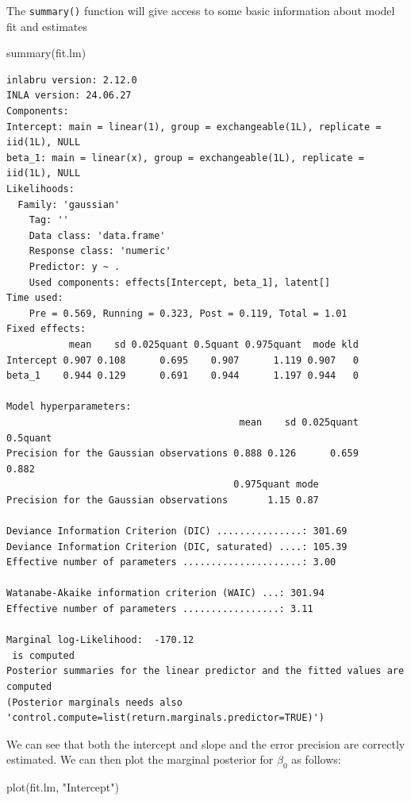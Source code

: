 \documentclass[
  letterpaper,
  DIV=11,
  numbers=noendperiod]{scrartcl}
\newenvironment{Shaded}{\begin{snugshade}}{\end{snugshade}}
\newcommand{\FunctionTok}[1]{\textcolor[rgb]{0.28,0.35,0.67}{#1}}
\newcommand{\NormalTok}[1]{\textcolor[rgb]{0.00,0.23,0.31}{#1}}
\newcommand{\StringTok}[1]{\textcolor[rgb]{0.13,0.47,0.30}{#1}}
\begin{document}
The \texttt{summary()} function will give access to some basic
information about model fit and estimates

\begin{Shaded}
\begin{Highlighting}[]
\FunctionTok{summary}\NormalTok{(fit.lm)}
\end{Highlighting}
\end{Shaded}

\begin{verbatim}
inlabru version: 2.12.0
INLA version: 24.06.27
Components:
Intercept: main = linear(1), group = exchangeable(1L), replicate = iid(1L), NULL
beta_1: main = linear(x), group = exchangeable(1L), replicate = iid(1L), NULL
Likelihoods:
  Family: 'gaussian'
    Tag: ''
    Data class: 'data.frame'
    Response class: 'numeric'
    Predictor: y ~ .
    Used components: effects[Intercept, beta_1], latent[]
Time used:
    Pre = 0.569, Running = 0.323, Post = 0.119, Total = 1.01 
Fixed effects:
           mean    sd 0.025quant 0.5quant 0.975quant  mode kld
Intercept 0.907 0.108      0.695    0.907      1.119 0.907   0
beta_1    0.944 0.129      0.691    0.944      1.197 0.944   0

Model hyperparameters:
                                         mean    sd 0.025quant 0.5quant
Precision for the Gaussian observations 0.888 0.126      0.659    0.882
                                        0.975quant mode
Precision for the Gaussian observations       1.15 0.87

Deviance Information Criterion (DIC) ...............: 301.69
Deviance Information Criterion (DIC, saturated) ....: 105.39
Effective number of parameters .....................: 3.00

Watanabe-Akaike information criterion (WAIC) ...: 301.94
Effective number of parameters .................: 3.11

Marginal log-Likelihood:  -170.12 
 is computed 
Posterior summaries for the linear predictor and the fitted values are computed
(Posterior marginals needs also 'control.compute=list(return.marginals.predictor=TRUE)')
\end{verbatim}

We can see that both the intercept and slope and the error precision are
correctly estimated. We can then plot the marginal posterior for
\(\beta_0\) as follows:

\begin{Shaded}
\begin{Highlighting}[]
\FunctionTok{plot}\NormalTok{(fit.lm, }\StringTok{"Intercept"}\NormalTok{)}
\end{Highlighting}
\end{Shaded}
\end{document}
